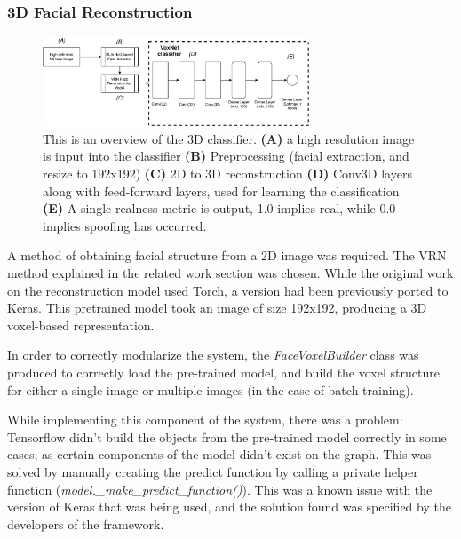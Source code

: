 \documentclass[12pt,a4paper]{article}
\begin{document}
        \subsubsection{3D Facial Reconstruction}
        \begin{figure}
            \centering
            \includegraphics[width=300px]{voxnet.pdf}
            \caption{
                This is an overview of the 3D classifier. \textbf{(A)} a high resolution image is input into the classifier \textbf{(B)} Preprocessing (facial extraction, and resize to 192x192)
                \textbf{(C)} 2D to 3D reconstruction
                \textbf{(D)} Conv3D layers along with feed-forward layers, used for learning the classification
                \textbf{(E)} A single realness metric is output, 1.0 implies real, while 0.0 implies spoofing has occurred.
            }
            \label{3DClassifierArchitectureDiagram}
        \end{figure}

            A method of obtaining facial structure from a 2D image was required. The VRN method explained in the related work section was chosen. \cite{3DReconstructionMethod}
            While the original work on the reconstruction model used Torch, a version had been previously ported to Keras.\cite{VRNTorchToKeras} This pretrained model took an image of size 192x192, producing a 3D voxel-based representation. 

            In order to correctly modularize the system, the \emph{FaceVoxelBuilder} class was produced to correctly load the pre-trained model, and build the voxel structure for either a single image or multiple images (in the case of batch training).

            While implementing this component of the system, there was a problem: Tensorflow didn't build the objects from the pre-trained model correctly in some cases, as certain components of the model didn't exist on the graph. This was solved by manually creating the predict function by calling a private helper function (\emph{model.\_make\_predict\_function()}).
            This was a known issue with the version of Keras that was being used, and the solution found was specified by the developers of the framework. \cite{KerasVoxNetBug}
\end{document}
